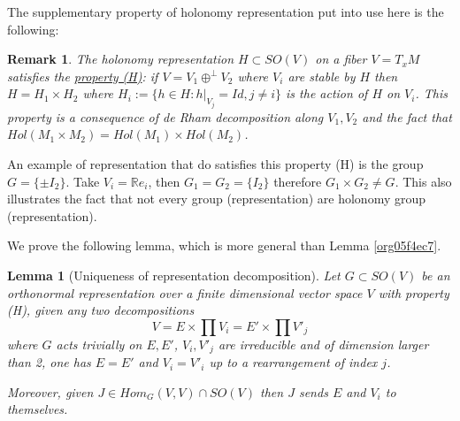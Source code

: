 \documentclass[11pt]{article}
\newtheorem{remark}{Remark}
\newtheorem{lemma}[theorem]{Lemma}
\begin{document}
The supplementary property of holonomy representation put into use here is the following:

\begin{remark}
The holonomy representation \(H\subset SO(V)\) on a fiber \(V=T_xM\) satisfies the \uline{property (H)}: if \(V
= V_1 \oplus^\perp V_2\) where \(V_i\) are stable by \(H\) then \(H = H_1\times H_2\) where \(H_i:= \{ h\in
H: h|_{V_j} = Id, j\ne i\}\) is the action of \(H\) on \(V_i\). This property is a consequence of de Rham
decomposition along \(V_1, V_2\) and the fact that \(Hol(M_1\times M_2) = Hol(M_1)\times Hol(M_2)\).
\end{remark}

An example of representation that do satisfies this property (H) is the group \(G = \{\pm
I_2\}\). Take \(V_i = \mathbb{R}e_i\), then \(G_1 = G_2 = \{I_2\}\) therefore \(G_1\times G_2\ne
G\). This also illustrates the fact that not every group (representation) are holonomy group
(representation).

We prove the following lemma, which is more general than Lemma \ref{org05f4ec7}.
\begin{lemma}[Uniqueness of representation decomposition]
\label{lem:unique-representation}
\label{org37fcf67}
Let \(G\subset SO(V)\) be an orthonormal representation over a finite dimensional vector space \(V\) with
property (H), given any two decompositions
\[
V = E \times \prod V_i = E' \times \prod V'_j
\]
where \(G\) acts trivially on \(E, E'\), \(V_i, V'_j\) are irreducible and of dimension larger than 2,
one has \(E = E'\) and \(V_i = V'_i\) up to a rearrangement of index \(j\).

Moreover, given \(J\in Hom_G(V,V)\cap SO(V)\) then \(J\) sends \(E\) and \(V_i\) to themselves.
\end{lemma}
\end{document}
